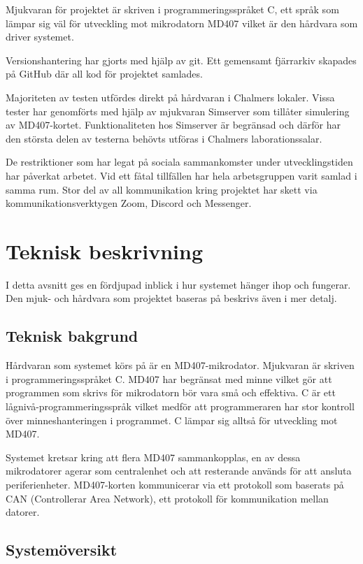 \documentclass[a4paper]{article}
\begin{document}
Mjukvaran för projektet är skriven i programmeringsspråket C, ett språk som lämpar sig väl för utveckling mot mikrodatorn MD407 vilket är den hårdvara som driver systemet.

Versionshantering har gjorts med hjälp av git.
Ett gemensamt fjärrarkiv skapades på GitHub där all kod för projektet samlades.

Majoriteten av testen utfördes direkt på hårdvaran i Chalmers lokaler.
Vissa tester har genomförts med hjälp av mjukvaran Simserver som tillåter simulering av MD407-kortet.
Funktionaliteten hos Simserver är begränsad och därför har den största delen av testerna behövts utföras i Chalmers laborationssalar.

De restriktioner som har legat på sociala sammankomster under utvecklingstiden har påverkat arbetet. Vid ett fåtal tillfällen har hela arbetsgruppen varit samlad i samma rum.
Stor del av all kommunikation kring projektet har skett via kommunikationsverktygen Zoom, Discord och Messenger.

\newpage

\section{Teknisk beskrivning}
I detta avsnitt ges en fördjupad inblick i hur systemet hänger ihop och fungerar.
Den mjuk- och hårdvara som projektet baseras på beskrivs även i mer detalj.

\subsection{Teknisk bakgrund}
Hårdvaran som systemet körs på är en MD407-mikrodator.
Mjukvaran är skriven i programmeringsspråket C.
MD407 har begränsat med minne vilket gör att programmen som skrivs för mikrodatorn bör vara små och effektiva.
C är ett lågnivå-programmeringsspråk vilket medför att programmeraren har stor kontroll över minneshanteringen i programmet.
C lämpar sig alltså för utveckling mot MD407.

Systemet kretsar kring att flera MD407 sammankopplas, en av dessa mikrodatorer agerar som centralenhet och att resterande används för att ansluta periferienheter.
MD407-korten kommunicerar via ett protokoll som baserats på CAN (Controllerar Area Network), ett protokoll för kommunikation mellan datorer.

\subsection{Systemöversikt}
\end{document}
